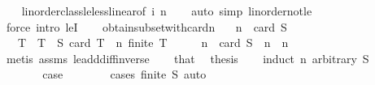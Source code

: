 \begin{isabellebody}
%
\isadelimproof
\ \ %
\endisadelimproof
%
\isatagproof
{}\isamarkupfalse%
\ linorder{\isacharunderscore}{\kern0pt}class{\isachardot}{\kern0pt}le{\isacharunderscore}{\kern0pt}less{\isacharunderscore}{\kern0pt}linear{\isacharbrackleft}{\kern0pt}of\ i\ n{\isacharbrackright}{\kern0pt}\isanewline
\ \ \isamarkupfalse%
\ {\isacharparenleft}{\kern0pt}auto\ simp{\isacharcolon}{\kern0pt}\ linorder{\isacharunderscore}{\kern0pt}not{\isacharunderscore}{\kern0pt}le{\isacharparenright}{\kern0pt}\isanewline
\ \ \ \isamarkupfalse%
\ {\isacharparenleft}{\kern0pt}force\ intro{\isacharcolon}{\kern0pt}\ leI{\isacharparenright}{\kern0pt}{\isacharplus}{\kern0pt}\isanewline
\ \ \isamarkupfalse%
%
\endisatagproof
{\isafoldproof}%
%
\isadelimproof
\isanewline
%
\endisadelimproof
\isanewline
{}\isamarkupfalse%
\ obtain{\isacharunderscore}{\kern0pt}subset{\isacharunderscore}{\kern0pt}with{\isacharunderscore}{\kern0pt}card{\isacharunderscore}{\kern0pt}n{\isacharcolon}{\kern0pt}\isanewline
\ \ \ {\isachardoublequoteopen}n\ {\isasymle}\ card\ S{\isachardoublequoteclose}\isanewline
\ \ \ T\ \ {\isachardoublequoteopen}T\ {\isasymsubseteq}\ S{\isachardoublequoteclose}\ {\isachardoublequoteopen}card\ T\ {\isacharequal}{\kern0pt}\ n{\isachardoublequoteclose}\ {\isachardoublequoteopen}finite\ T{\isachardoublequoteclose}\isanewline
%
\isadelimproof
%
\endisadelimproof
%
\isatagproof
{}\isamarkupfalse%
\ {\isacharminus}{\kern0pt}\isanewline
\ \ \isamarkupfalse%
\ n{\isacharprime}{\kern0pt}\ \ {\isachardoublequoteopen}card\ S\ {\isacharequal}{\kern0pt}\ n\ {\isacharplus}{\kern0pt}\ n{\isacharprime}{\kern0pt}{\isachardoublequoteclose}\ \isanewline
\ \ \ \ \isamarkupfalse%
\ {\isacharparenleft}{\kern0pt}metis\ assms\ le{\isacharunderscore}{\kern0pt}add{\isacharunderscore}{\kern0pt}diff{\isacharunderscore}{\kern0pt}inverse{\isacharparenright}{\kern0pt}\isanewline
\ \ \isamarkupfalse%
\ that\ \isamarkupfalse%
\ thesis\isanewline
\ \ \isamarkupfalse%
\ {\isacharparenleft}{\kern0pt}induct\ n{\isacharprime}{\kern0pt}\ arbitrary{\isacharcolon}{\kern0pt}\ S{\isacharparenright}{\kern0pt}\isanewline
\ \ \ \ \isamarkupfalse%
\ {}\ \isanewline
\ \ \ \ \isamarkupfalse%
\ \isamarkupfalse%
\ {\isacharquery}{\kern0pt}case\isanewline
\ \ \ \ \ \ \isamarkupfalse%
\ {\isacharparenleft}{\kern0pt}cases\ {\isachardoublequoteopen}finite\ S{\isachardoublequoteclose}{\isacharparenright}{\kern0pt}\ auto\isanewline

\end{isabellebody}
